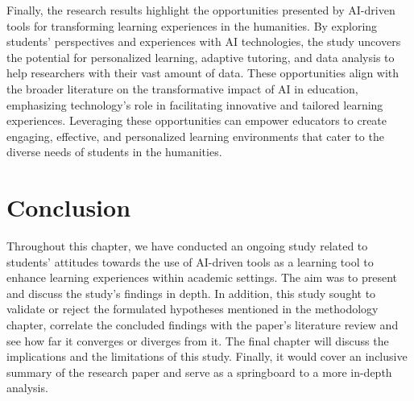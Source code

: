 Finally, the research results highlight the opportunities presented
by AI-driven tools for transforming learning experiences in the humanities.
By exploring students' perspectives and experiences with AI technologies,
the study uncovers the potential for personalized learning, adaptive tutoring,
and data analysis to help researchers with their vast amount of data.
These opportunities align with the broader literature on the transformative
impact of AI in education, emphasizing technology's role in facilitating
innovative and tailored learning experiences. Leveraging these opportunities
can empower educators to create engaging, effective, and personalized learning
environments that cater to the diverse needs of students in the humanities.
\section{Conclusion}

Throughout this chapter, we have conducted an ongoing study related to
students' attitudes towards the use of AI-driven tools as a learning
tool to enhance learning experiences within academic settings. The
aim was to present and discuss the study's findings in depth.
In addition, this study sought to validate or reject the formulated
hypotheses mentioned in the methodology chapter, correlate the
concluded findings with the paper's literature review and see
how far it converges or diverges from it. The final chapter
will discuss the implications and the limitations of this
study. Finally, it would cover an inclusive summary of the
research paper and serve as a springboard to a more in-depth analysis.

 
